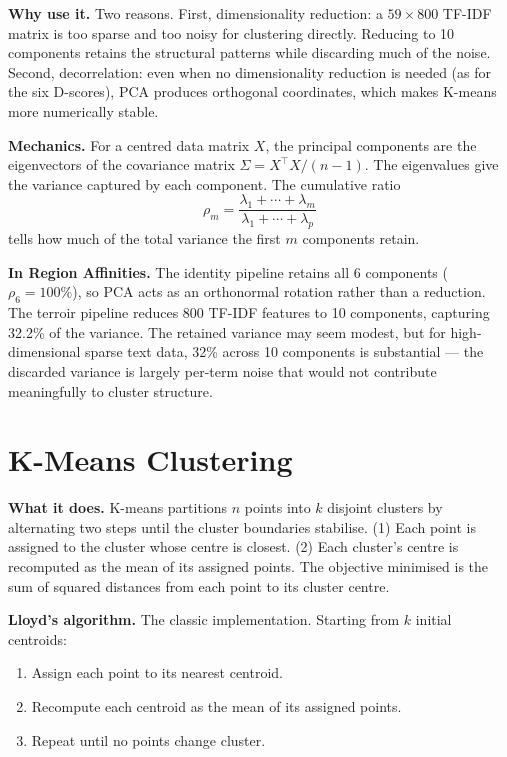 \documentclass[11pt]{article}
\begin{document}
\textbf{Why use it.} Two reasons. First, dimensionality reduction: a $59 \times 800$ TF-IDF matrix is too sparse and too noisy for clustering directly. Reducing to 10 components retains the structural patterns while discarding much of the noise. Second, decorrelation: even when no dimensionality reduction is needed (as for the six D-scores), PCA produces orthogonal coordinates, which makes K-means more numerically stable.

\textbf{Mechanics.} For a centred data matrix $X$, the principal components are the eigenvectors of the covariance matrix $\Sigma = X^\top X / (n - 1)$. The eigenvalues give the variance captured by each component. The cumulative ratio
\[
\rho_m = \frac{\lambda_1 + \cdots + \lambda_m}{\lambda_1 + \cdots + \lambda_p}
\]
tells how much of the total variance the first $m$ components retain.

\textbf{In Region Affinities.} The identity pipeline retains all 6 components ($\rho_6 = 100\%$), so PCA acts as an orthonormal rotation rather than a reduction. The terroir pipeline reduces 800 TF-IDF features to 10 components, capturing 32.2\% of the variance. The retained variance may seem modest, but for high-dimensional sparse text data, 32\% across 10 components is substantial --- the discarded variance is largely per-term noise that would not contribute meaningfully to cluster structure.

\section{K-Means Clustering}

\textbf{What it does.} K-means partitions $n$ points into $k$ disjoint clusters by alternating two steps until the cluster boundaries stabilise. (1) Each point is assigned to the cluster whose centre is closest. (2) Each cluster's centre is recomputed as the mean of its assigned points. The objective minimised is the sum of squared distances from each point to its cluster centre.

\textbf{Lloyd's algorithm.} The classic implementation. Starting from $k$ initial centroids:
\begin{enumerate}[leftmargin=2em,itemsep=0.1em,topsep=0.1em]
\item Assign each point to its nearest centroid.
\item Recompute each centroid as the mean of its assigned points.
\item Repeat until no points change cluster.
\end{enumerate}
\end{document}
